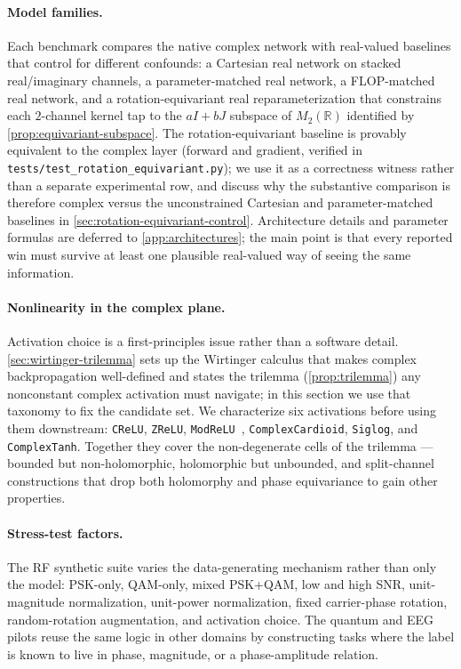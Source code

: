 \documentclass{article}
\providecommand{\Cref}[1]{\autoref{#1}}
\newcommand{\code}[1]{\texttt{#1}}
\begin{document}
\paragraph{Model families.}
Each benchmark compares the native complex network with real-valued
baselines that control for different confounds: a Cartesian real
network on stacked real/imaginary channels, a parameter-matched real
network, a FLOP-matched real network, and a rotation-equivariant real
reparameterization that constrains each $2$-channel kernel tap to the
$aI+bJ$ subspace of $M_2(\mathbb{R})$ identified by
\Cref{prop:equivariant-subspace}. The rotation-equivariant baseline is
provably equivalent to the complex layer (forward and gradient,
verified in \code{tests/test\_rotation\_equivariant.py}); we use it as
a correctness witness rather than a separate experimental row, and
discuss why the substantive comparison is therefore complex versus the
unconstrained Cartesian and parameter-matched baselines in
\Cref{sec:rotation-equivariant-control}. Architecture details and
parameter formulas are deferred to \Cref{app:architectures}; the main
point is that every reported win must survive at least one plausible
real-valued way of seeing the same information.

\paragraph{Nonlinearity in the complex plane.}
Activation choice is a first-principles issue rather than a software
detail. \Cref{sec:wirtinger-trilemma} sets up the Wirtinger calculus
that makes complex backpropagation well-defined and states the
trilemma (\Cref{prop:trilemma}) any nonconstant complex activation
must navigate; in this section we use that taxonomy to fix the
candidate set. We characterize six activations before using them
downstream: \code{CReLU}, \code{ZReLU},
\code{ModReLU}~\cite{arjovsky2016unitary}, \code{ComplexCardioid},
\code{Siglog}, and \code{ComplexTanh}. Together they cover the
non-degenerate cells of the trilemma --- bounded but non-holomorphic,
holomorphic but unbounded, and split-channel constructions that drop
both holomorphy and phase equivariance to gain other properties.

\paragraph{Stress-test factors.}
The RF synthetic suite varies the data-generating mechanism rather
than only the model: PSK-only, QAM-only, mixed PSK+QAM, low and high
SNR, unit-magnitude normalization, unit-power normalization, fixed
carrier-phase rotation, random-rotation augmentation, and activation
choice. The quantum and EEG pilots reuse the same logic in other
domains by constructing tasks where the label is known to live in
phase, magnitude, or a phase-amplitude relation.
\end{document}
